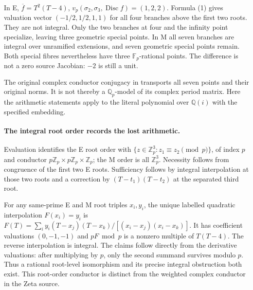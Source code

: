 \documentclass[11pt,reqno]{amsart}
\begin{document}
In E, $\overline f=T^2(T-4)$, $v_p(\sigma_2,\sigma_3,\operatorname{Disc}f)
=(1,2,2)$. Formula (1) gives valuation vector
$(-1/2,1/2,1,1)$ for all four branches above the first two roots. They are not
integral. Only the two branches at four and the infinity point specialize,
leaving three geometric special points. In M all seven branches are integral
over unramified extensions, and seven geometric special points remain.
Both special fibres nevertheless have three $\mathbb F_p$-rational points.
The difference is not a zero source Jacobian: $-2$ is still a unit.

The original complex conductor conjugacy in \cite[FC32--35]{Zeta} transports
all seven points and their original norms. It is not thereby a $\mathbb Q_p$-model
of its complex period matrix. Here the arithmetic statements apply to the literal
polynomial over $\mathbb Q(i)$ with the specified embedding.


\paragraph{The integral root order records the lost arithmetic.}
Evaluation identifies the E root order with
$\{z\in\mathbb Z_p^3:z_1\equiv z_2\pmod p\}$, of index $p$ and conductor
$p\mathbb Z_p\times p\mathbb Z_p\times\mathbb Z_p$; the M order is all
$\mathbb Z_p^3$. Necessity follows from congruence of the first two E roots.
Sufficiency follows by integral interpolation at those two roots and a correction
by $(T-t_1)(T-t_2)$ at the separated third root.

For any same-prime E and M root triples $x_i,y_i$, the unique labelled quadratic
interpolation $F(x_i)=y_i$ is
$F(T)=\sum_i y_i(T-x_j)(T-x_k)/[(x_i-x_j)(x_i-x_k)]$.
It has coefficient valuations $(0,-1,-1)$ and $pF\bmod p$ is a nonzero multiple
of $T(T-4)$. The reverse interpolation is integral. The claims follow directly
from the derivative valuations: after multiplying by $p$, only the second
summand survives modulo $p$. Thus a rational root-level isomorphism and its
precise integral obstruction both exist. This root-order conductor is distinct
from the weighted complex conductor in the Zeta source.
\end{document}
